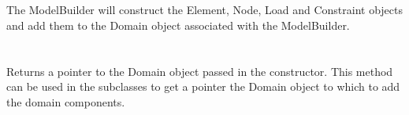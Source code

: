  \\
 \\
The ModelBuilder will construct the Element, Node, Load and Constraint
objects and add them to the Domain object associated with the ModelBuilder. \\

 \\
 \\
Returns a pointer to the Domain object passed in the constructor. This
method can be used in the subclasses to get a pointer the Domain object
to which to add the domain components. \\


